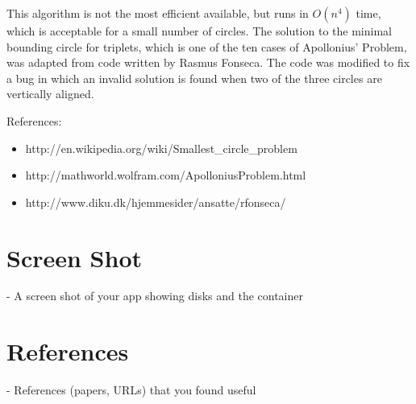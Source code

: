 \documentclass[a4paper]{article}
\begin{document}
This algorithm is not the most efficient available, but runs in $O(n^4)$ time, which is acceptable for a small number of circles.
The solution to the minimal bounding circle for triplets, which is one of the ten cases of Apollonius' Problem, was adapted from code written by Rasmus Fonseca.
The code was modified to fix a bug in which an invalid solution is found when two of the three circles are vertically aligned.

References:
\begin{itemize}
	\item http://en.wikipedia.org/wiki/Smallest\_circle\_problem
	\item http://mathworld.wolfram.com/ApolloniusProblem.html
	\item http://www.diku.dk/hjemmesider/ansatte/rfonseca/
\end{itemize}

\section{Screen Shot}
 - A screen shot of your app showing disks and the container
 
 \section{References}
  - References (papers, URLs) that you found useful
 
\end{document}
